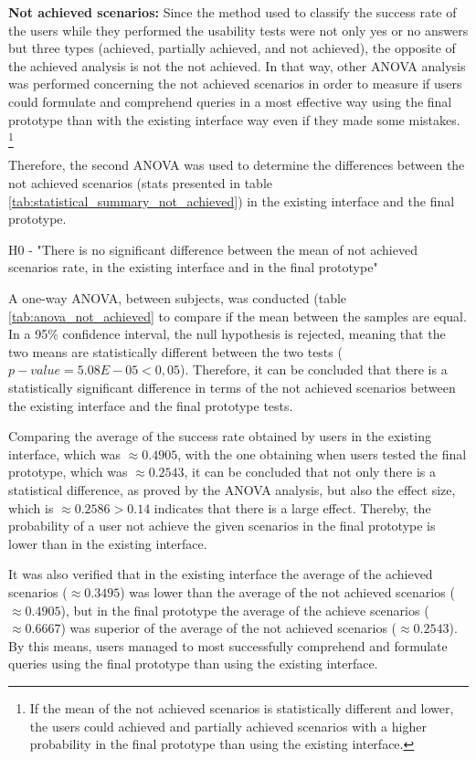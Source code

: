 \textbf{Not achieved scenarios:}
Since the method used to classify the success rate of the users while they performed the usability tests were not only yes or no answers but three types (achieved, partially achieved, and not achieved), the opposite of the achieved analysis is not the not achieved. In that way, other ANOVA analysis was performed concerning the not achieved scenarios in order to 
measure if users could formulate and comprehend queries in a most effective way using the final prototype than with the existing interface way even if they made some mistakes. \footnote{If the mean of the not achieved scenarios is statistically different and lower, the users could achieved and partially achieved scenarios with a higher probability in the final prototype than using the existing interface.} 

Therefore, the second ANOVA was used to determine the differences between the not achieved scenarios (stats presented in table \ref{tab:statistical_summary_not_achieved}) in the existing interface and the final prototype.

\begin{center}
  H0 - "There is no significant difference between the mean of not achieved scenarios rate, in the existing interface and in the final prototype"
\end{center}

A one-way ANOVA, between subjects, was conducted (table \ref{tab:anova_not_achieved} to compare if the mean between the samples are equal. In a 95\% confidence interval, the null hypothesis is rejected, meaning that the two means are statistically different between the two tests ($p-value = 5.08E-05 < 0,05$). Therefore, it can be concluded that there is a statistically significant difference in terms of the not achieved scenarios between the existing interface and the final prototype tests.

Comparing the average of the success rate obtained by users in the existing interface, which was $\approx 0.4905$, with the one obtaining when users tested the final prototype, which was $\approx 0.2543$, it can be concluded that not only there is a statistical difference, as proved by the ANOVA analysis, but also the effect size, which is $\approx 0.2586 > 0.14$ indicates that there is a large effect. Thereby, the probability of a user not achieve the given scenarios in the final prototype is lower than in the existing interface. 

It was also verified that in the existing interface the average of the achieved scenarios ($\approx 0.3495$) was lower than the average of the not achieved scenarios ($\approx 0.4905$), but in the final prototype the average of the achieve scenarios ($\approx 0.6667$) was superior of the average of the not achieved scenarios ($\approx 0.2543$). By this means, users managed to most successfully comprehend and formulate queries using the final prototype than using the existing interface.



